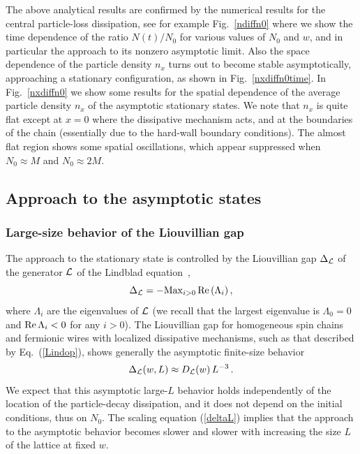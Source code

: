   
  The above analytical results are confirmed by the numerical results
  for the central particle-loss dissipation, see for example
  Fig.~\ref{ndiffn0} where we show the time dependence of the ratio
  $N(t)/N_0$ for various values of $N_0$ and $w$, and in particular the
  approach to its nonzero asymptotic limit. Also the space dependence of
  the particle density $n_x$ turns out to become stable asymptotically,
  approaching a stationary configuration, as shown in
  Fig.~\ref{nxdiffn0time}.  In Fig.~\ref{nxdiffn0} we show some results
  for the spatial dependence of the average particle density $n_x$ of
  the asymptotic stationary states. We note that $n_x$ is quite flat
  except at $x=0$ where the dissipative mechanism acts, and at the
  boundaries of the chain (essentially due to the hard-wall boundary
  conditions). The almost flat region shows some spatial oscillations,
  which appear suppressed when $N_0\approx M$ and $N_0\approx 2M$.
  
  
  \subsection{Approach to the asymptotic states}
  \label{asyappro}
  
  
  \subsubsection{Large-size behavior of the Liouvillian gap}
  \label{liogap}
  
  
  
  The approach to the stationary state is controlled by the Liouvillian
  gap $\Delta_{\cal L}$ of the generator ${\cal L}$ of the Lindblad
  equation~\cite{BP-book,RH-book,Znidaric-15,MBBC-18,SK-20},
  \begin{equation}
  \Delta_{\cal L} = - {\rm Max}_{i>0} \, {\rm Re}\,(\Lambda_i)\,,
  \label{deltadeb}
  \end{equation}
  where $\Lambda_i$ are the eigenvalues of ${\cal L}$ (we recall that
  the largest eigenvalue is $\Lambda_0=0$ and ${\rm Re} \,\Lambda_i<0$
  for any $i>0$).  The Liouvillian gap for homogeneous spin chains and
  fermionic wires with localized dissipative mechanisms, such as that
  described by Eq.~(\ref{Lindop}), shows generally the asymptotic
  finite-size
  behavior~\cite{PP-08,Prosen-08,Znidaric-15,SK-20,TV-21}
  \begin{equation}
  \Delta_{\cal L}(w,L)\approx D_{\cal L}(w) \,L^{-3}\,.  
  \label{deltaL}
  \end{equation}
  We expect that this asymptotic large-$L$ behavior holds independently
  of the location of the particle-decay dissipation, and it does not
  depend on the initial conditions, thus on $N_0$.  The scaling equation
  (\ref{deltaL}) implies that the approach to the asymptotic behavior
  becomes slower and slower with increasing the size $L$ of the lattice
  at fixed $w$.
  
